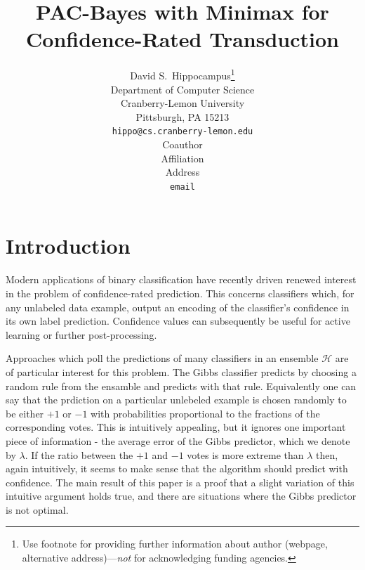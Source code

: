 \documentclass{article}[12pt]
\title{PAC-Bayes with Minimax for Confidence-Rated Transduction}
\author{
David S.~Hippocampus\thanks{ Use footnote for providing further information
about author (webpage, alternative address)---\emph{not} for acknowledging
funding agencies.} \\
Department of Computer Science\\
Cranberry-Lemon University\\
Pittsburgh, PA 15213 \\
\texttt{hippo@cs.cranberry-lemon.edu} \\
\And
Coauthor \\
Affiliation \\
Address \\
\texttt{email}
}
\theoremstyle{named}
\newcommand{\cH}{\mathcal{H}}
\begin{document}
\maketitle






\section{Introduction}
Modern applications of binary classification have recently driven
renewed interest in the problem of confidence-rated
prediction. \cite{??}  This concerns classifiers which, for any
unlabeled data example, output an encoding of the classifier's
confidence in its own label prediction. Confidence values can
subsequently be useful for active learning or further post-processing.

Approaches which poll the predictions of many classifiers in an
ensemble $\cH$ are of particular interest for this problem. \cite{??}
The Gibbs classifier predicts by choosing a random rule from the
ensamble and predicts with that rule. Equivalently one can say that
the prdiction on a particular unlebeled example is chosen randomly to
be either $+1$ or $-1$ with probabilities proportional to the
fractions of the corresponding votes. This is intuitively appealing,
but it ignores one important piece of information - the average error
of the Gibbs predictor, which we denote by $\lambda$. If the ratio
between the $+1$ and $-1$ votes is more extreme than $\lambda$ then,
again intuitively, it seems to make sense that the algorithm should
predict with confidence. The main result of this paper is a proof that
a slight variation of this intuitive argument holds true, and there
are situations where the Gibbs predictor is not optimal.

\end{document}

